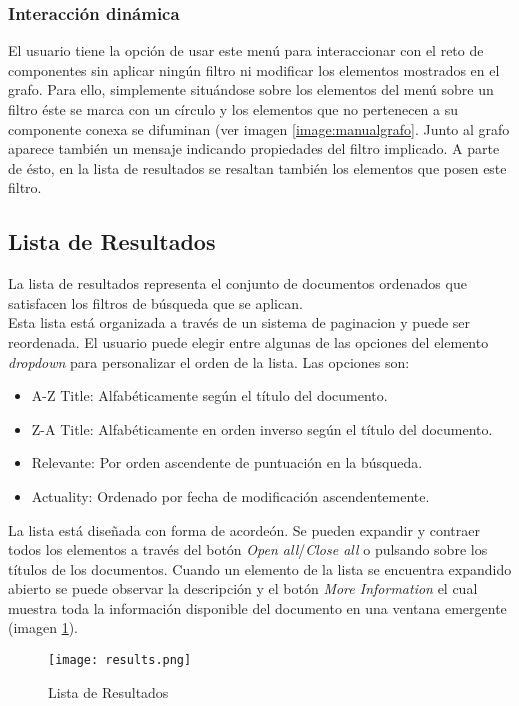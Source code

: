 \subsubsection*{Interacción dinámica}
El usuario tiene la opción de usar este menú para interaccionar con el reto de componentes sin aplicar ningún filtro ni modificar los elementos mostrados en el grafo. Para ello, simplemente situándose sobre los elementos del menú sobre un filtro éste se marca con un círculo y los elementos que no pertenecen a su componente conexa se difuminan (ver imagen \ref{image:manualgrafo}. Junto al grafo aparece también un mensaje indicando propiedades del filtro implicado. A parte de ésto, en la lista de resultados se resaltan también los elementos que posen este filtro.

\subsection{Lista de Resultados}
La lista de resultados representa el conjunto de documentos ordenados que satisfacen los filtros de búsqueda que se aplican.\\

Esta lista está organizada a través de un sistema de \gls{paginacion} y puede ser reordenada. El usuario puede elegir entre algunas de las opciones del elemento \textit{dropdown} para personalizar el orden de la lista. Las opciones son:

\begin{itemize}
	\item{A-Z Title}: Alfabéticamente según el título del documento.
	\item{Z-A Title}: Alfabéticamente en orden inverso según el título del documento.
	\item{Relevante}: Por orden ascendente de puntuación en la búsqueda.
	\item{Actuality}: Ordenado por fecha de modificación ascendentemente.
\end{itemize}

La lista está diseñada con forma de acordeón. Se pueden expandir y contraer todos los elementos a través del botón \textit{Open all}/\textit{Close all} o pulsando sobre los títulos de los documentos. Cuando un elemento de la lista se encuentra expandido abierto se puede observar la descripción y el botón \textit{More Information} el cual muestra toda la información disponible del documento en una ventana emergente (imagen \ref{image:listaresults}).

\begin{figure}[h!]
  \centering
  	\texttt{[image: results.png]}
  \caption{Lista de Resultados}
  \label{image:listaresults}
\end{figure}

